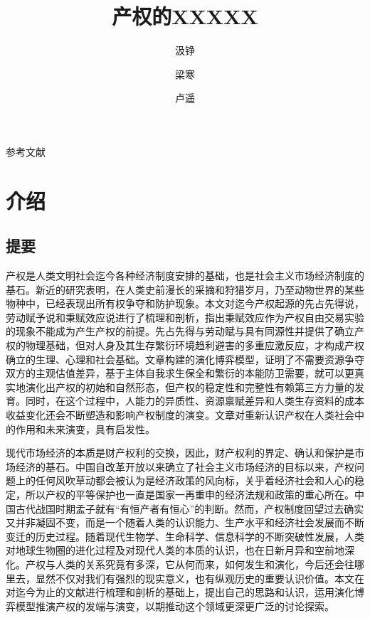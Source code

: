 \documentclass[lang=cn,12pt,a4paper]{elegantpaper}
\title{产权的XXXXX}
\author{汲铮 \and 梁寒 \and 卢遥}
\institute{}
\date{\zhtoday}
\begin{document}
\maketitle
参考文献

\begin{abstract}

\end{abstract}



\section{介绍}

\subsection{提要}

产权是人类文明社会迄今各种经济制度安排的基础，也是社会主义市场经济制度的基石。新近的研究表明，在人类史前漫长的采摘和狩猎岁月，乃至动物世界的某些物种中，已经表现出所有权争夺和防护现象。本文对迄今产权起源的先占先得说，劳动赋予说和秉赋效应说进行了梳理和剖析，指出秉赋效应作为产权自由交易实验的现象不能成为产生产权的前提。先占先得与劳动赋与具有同源性并提供了确立产权的物理基础，但对人身及其生存繁衍环境趋利避害的多重应激反应，才构成产权确立的生理、心理和社会基础。文章构建的演化博弈模型，证明了不需要资源争夺双方的主观估值差异，基于主体自我求生保全和繁衍的本能防卫需要，就可以更真实地演化出产权的初始和自然形态，但产权的稳定性和完整性有赖第三方力量的发育。同时，在这个过程中，人能力的异质性、资源禀赋差异和人类生存资料的成本收益变化还会不断塑造和影响产权制度的演变。文章对重新认识产权在人类社会中的作用和未来演变，具有启发性。

现代市场经济的本质是财产权利的交换，因此，财产权利的界定、确认和保护是市场经济的基石。中国自改革开放以来确立了社会主义市场经济的目标以来，产权问题上的任何风吹草动都会被认为是经济政策的风向标，关乎着经济社会和人心的稳定，所以产权的平等保护也一直是国家一再重申的经济法规和政策的重心所在。中国古代战国时期孟子就有“有恒产者有恒心”的判断。然而，产权制度回望过去确实又并非凝固不变，而是一个随着人类的认识能力、生产水平和经济社会发展而不断变迁的历史过程。随着现代生物学、生命科学、信息科学的不断突破性发展，人类对地球生物圈的进化过程及对现代人类的本质的认识，也在日新月异和空前地深化。产权与人类的关系究竟有多深，它从何而来，如何发生和演化，今后还会往哪里去，显然不仅对我们有强烈的现实意义，也有纵观历史的重要认识价值。本文在对迄今为止的文献进行梳理和剖析的基础上，提出自己的思路和认识，运用演化博弈模型推演产权的发端与演变，以期推动这个领域更深更广泛的讨论探索。
\end{document}
